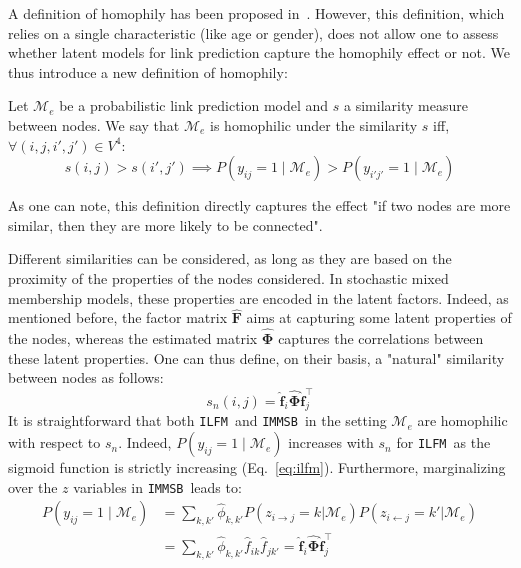 \documentclass{llncs}
\newcommand{\ifm}{\texttt{ILFM}}
\newcommand{\imb}{\texttt{IMMSB}}
\newcommand{\pr}{P}
\newcommand{\mat}[1]{\mathbf{#1}}
\begin{document}
A definition of homophily has been proposed in~\cite{la2010randomization}. However, this definition, which relies on a single characteristic (like age or gender), does not allow one to assess whether latent models for link prediction capture the homophily effect or not. We thus introduce a new definition of homophily:
%
\begin{definition}[Homophily] \label{def:homophily}
	Let $\mathcal{M}_e$ be a probabilistic link prediction model and $s$ a similarity measure between nodes. We say that $\mathcal{M}_e$ is homophilic under the similarity $s$ iff, $\forall (i,j,i',j') \in V^4$:
%
\begin{equation}
s(i,j) > s(i',j')  \implies \pr(y_{ij}=1 \mid \mathcal{M}_e) > \pr(y_{i'j'}=1  \mid \mathcal{M}_e) \nonumber
\end{equation}
%
\end{definition}
%
\noindent As one can note, this definition directly captures the effect "if two nodes are more similar, then they are more likely to be connected". 

Different similarities can be considered, as long as they are based on the proximity of the properties of the nodes considered. In stochastic mixed membership models, these properties are encoded in the latent factors. Indeed, as mentioned before, the factor matrix $\mat{\hat{F}}$ aims at capturing some latent properties of the nodes, whereas the estimated matrix $\mat{\hat{\Phi}}$ captures the correlations between these latent properties. One can thus define, on their basis, a "natural" similarity between nodes as follows:
%
\begin{equation}
s_n(i,j) = \mat{\hat{f}}_{i} \mat{\hat{\Phi}} \mat{\hat{f}}_j^\top \nonumber
\end{equation}
%
It is straightforward that both \ifm\ and \imb\ in the setting $\mathcal{M}_e$ are homophilic with respect to $s_n$. Indeed, $\pr(y_{ij}=1 \mid \mathcal{M}_e)$ increases with $s_n$ for \ifm\ as the sigmoid function is strictly increasing (Eq.~\ref{eq:ilfm}). Furthermore, marginalizing over the $z$ variables in \imb\ leads to:
%
\begin{align}
\pr(y_{ij} =1 \mid \mathcal{M}_e) & = \sum_{k,k'} \hat{\phi}_{k,k'} \pr(z_{i \rightarrow j}=k | \mathcal{M}_e) \pr(z_{i \leftarrow j}=k' | \mathcal{M}_e) \nonumber \\
& = \sum_{k,k'} \hat{\phi}_{k,k'} \hat{f}_{ik} \hat{f}_{jk'} = \mat{\hat{f}}_{i} \mat{\hat{\Phi}} \mat{\hat{f}}_j^\top \nonumber
\end{align}
\end{document}
